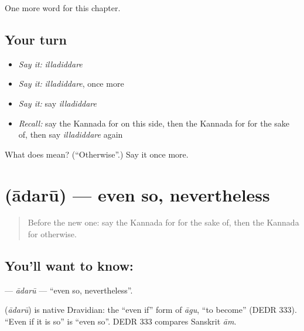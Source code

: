 \begin{grammarlens}[title={What you've built}]
One more word for this chapter.
\end{grammarlens}

\subsection*{Your turn}
\begin{itemize}
\raggedright
  \item \emph{Say it:} \emph{illadiddare}
  \item \emph{Say it:} \emph{illadiddare}, once more
  \item \emph{Say it:} say \emph{illadiddare}
  \item \emph{Recall:} say the Kannada for on this side, then the Kannada for for the sake of, then say \emph{illadiddare} again
\end{itemize}

\begin{tcolorbox}[breakable,colback=teal!4,colframe=teal!35!black,title={Before you move on}]
What does  mean? (\textquotedblleft{}Otherwise\textquotedblright{}.) Say it once more.
\end{tcolorbox}
\section[\texorpdfstring{\kn{ಆದರೂ} (ādarū)}{ಆದರೂ (ādarū)}]{ (ādarū) — even so, nevertheless}

\label{lesson:KA-C176-adaru}



\begin{quote}
Before the new one: say the Kannada for for the sake of, then the Kannada for otherwise.
\end{quote}

\subsection*{You'll want to know: }
\textbf{} — \emph{ādarū} — \textquotedblleft{}even so, nevertheless\textquotedblright{}.

\begin{cousinweb}
\textbf{} (\emph{ādarū}) is native Dravidian: the \textquotedblleft{}even if\textquotedblright{} form of \emph{āgu}, \textquotedblleft{}to become\textquotedblright{} (DEDR 333). \textquotedblleft{}Even if it is so\textquotedblright{} is \textquotedblleft{}even so\textquotedblright{}. DEDR 333 compares Sanskrit \emph{ām}.
\end{cousinweb}

